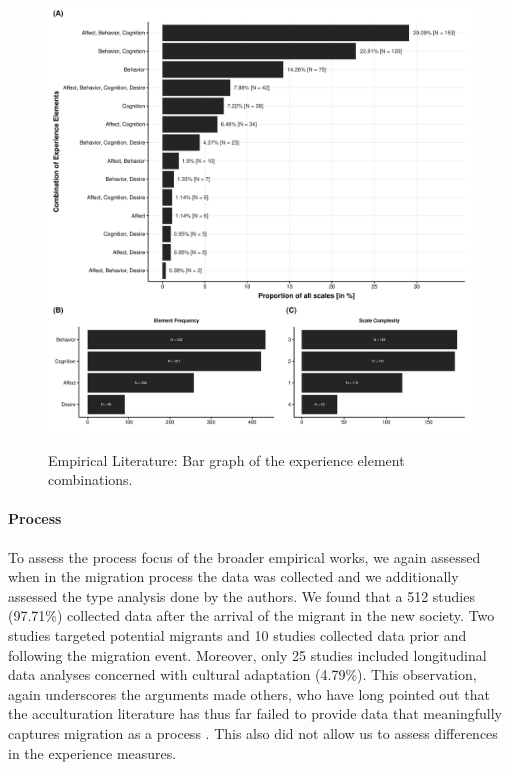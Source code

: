 \begin{figure}[h]
\centering
\caption{Empirical Literature: Bar graph of the experience element combinations.}
\includegraphics[width=\textwidth]{Figures/EmpPlotFreq-1}
\label{fig:EmpPlotFreq-1}
\end{figure}



\paragraph{Process}

To assess the process focus of the broader empirical works, we again
assessed when in the migration process the data was collected and we
additionally assessed the type analysis done by the authors. We found
that a 512 studies (97.71\%) collected data after the arrival of the
migrant in the new society. Two studies targeted potential migrants and
10 studies collected data prior and following the migration event.
Moreover, only 25 studies included longitudinal data analyses concerned
with cultural adaptation (4.79\%). This observation, again underscores
the arguments made others, who have long pointed out that the
acculturation literature has thus far failed to provide data that
meaningfully captures migration as a process
\citep[e.g.,][]{Brown2011, Ward2019}. This also did not allow us to
assess differences in the experience measures.

